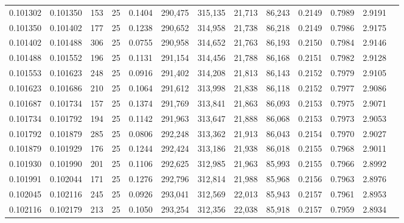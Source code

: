 \begin{tabular}{rrrrrrrrrrrrr}
0.101302 & 0.101350 &   153 &  25 &                                     0.1404 & 290,475 & 315,135 &  21,713 &  86,243 & 0.2149 & 0.7989 & 2.9191 \\
0.101350 & 0.101402 &   177 &  25 &                                     0.1238 & 290,652 & 314,958 &  21,738 &  86,218 & 0.2149 & 0.7986 & 2.9175 \\
0.101402 & 0.101488 &   306 &  25 &                                     0.0755 & 290,958 & 314,652 &  21,763 &  86,193 & 0.2150 & 0.7984 & 2.9146 \\
0.101488 & 0.101552 &   196 &  25 &                                     0.1131 & 291,154 & 314,456 &  21,788 &  86,168 & 0.2151 & 0.7982 & 2.9128 \\
0.101553 & 0.101623 &   248 &  25 &                                     0.0916 & 291,402 & 314,208 &  21,813 &  86,143 & 0.2152 & 0.7979 & 2.9105 \\
0.101623 & 0.101686 &   210 &  25 &                                     0.1064 & 291,612 & 313,998 &  21,838 &  86,118 & 0.2152 & 0.7977 & 2.9086 \\
0.101687 & 0.101734 &   157 &  25 &                                     0.1374 & 291,769 & 313,841 &  21,863 &  86,093 & 0.2153 & 0.7975 & 2.9071 \\
0.101734 & 0.101792 &   194 &  25 &                                     0.1142 & 291,963 & 313,647 &  21,888 &  86,068 & 0.2153 & 0.7973 & 2.9053 \\
0.101792 & 0.101879 &   285 &  25 &                                     0.0806 & 292,248 & 313,362 &  21,913 &  86,043 & 0.2154 & 0.7970 & 2.9027 \\
0.101879 & 0.101929 &   176 &  25 &                                     0.1244 & 292,424 & 313,186 &  21,938 &  86,018 & 0.2155 & 0.7968 & 2.9011 \\
0.101930 & 0.101990 &   201 &  25 &                                     0.1106 & 292,625 & 312,985 &  21,963 &  85,993 & 0.2155 & 0.7966 & 2.8992 \\
0.101991 & 0.102044 &   171 &  25 &                                     0.1276 & 292,796 & 312,814 &  21,988 &  85,968 & 0.2156 & 0.7963 & 2.8976 \\
0.102045 & 0.102116 &   245 &  25 &                                     0.0926 & 293,041 & 312,569 &  22,013 &  85,943 & 0.2157 & 0.7961 & 2.8953 \\
0.102116 & 0.102179 &   213 &  25 &                                     0.1050 & 293,254 & 312,356 &  22,038 &  85,918 & 0.2157 & 0.7959 & 2.8934 \\

\end{tabular}
